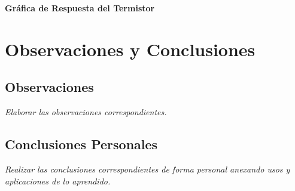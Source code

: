 \documentclass[11pt]{scrartcl}
\newcommand{\indicacion}[1]{\noindent\textit{\small #1}}
\begin{document}
\textbf{Gráfica de Respuesta del Termistor}
\begin{center}
 \end{center}



\section{Observaciones y Conclusiones}

\subsection{Observaciones}
\indicacion{
    Elaborar las observaciones correspondientes.
}

\subsection{Conclusiones Personales}
\indicacion{
    Realizar las conclusiones correspondientes de forma personal anexando usos y aplicaciones de lo aprendido.
}


  

    
\end{document}
